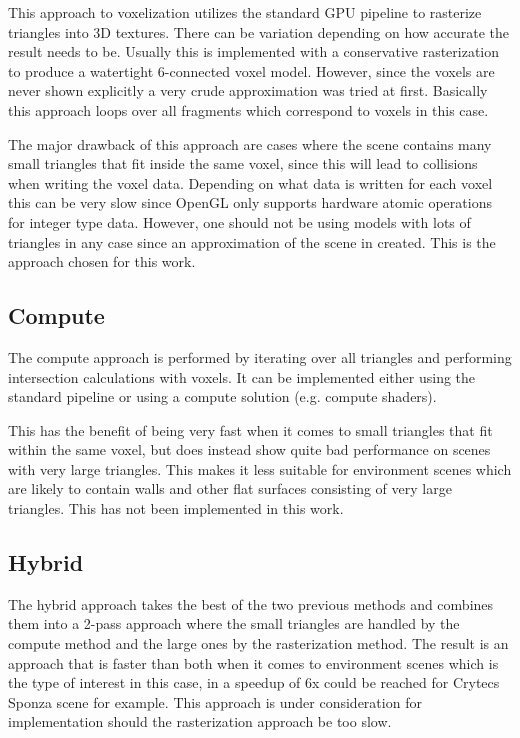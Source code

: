 This approach to voxelization utilizes the standard GPU pipeline to rasterize triangles into 3D textures. There can be variation depending on how accurate the result needs to be. Usually this is implemented with a conservative rasterization to produce a watertight 6-connected voxel model. However, since the voxels are never shown explicitly a very crude approximation was tried at first. Basically this approach loops over all fragments which correspond to voxels in this case. 

The major drawback of this approach are cases where the scene contains many small triangles that fit inside the same voxel, since this will lead to collisions when writing the voxel data. Depending on what data is written for each voxel this can be very slow since OpenGL only supports hardware atomic operations for integer type data. However, one should not be using models with lots of triangles in any case since an approximation of the scene in created. This is the approach chosen for this work.

\subsection{Compute}

The compute approach is performed by iterating over all triangles and performing intersection calculations with voxels. It can be implemented either using the standard pipeline or using a compute solution (e.g. compute shaders).

This has the benefit of being very fast when it comes to small triangles that fit within the same voxel, but does instead show quite bad performance on scenes with very large triangles. This makes it less suitable for environment scenes which are likely to contain walls and other flat surfaces consisting of very large triangles. This has not been implemented in this work.

\subsection{Hybrid}

The hybrid approach takes the best of the two previous methods and combines them into a 2-pass approach where the small triangles are handled by the compute method and the large ones by the rasterization method. The result is an approach that is faster than both when it comes to environment scenes which is the type of interest in this case, in \cite{phdthesis} a speedup of 6x could be reached for Crytecs Sponza scene for example. This approach is under consideration for implementation should the rasterization approach be too slow.

